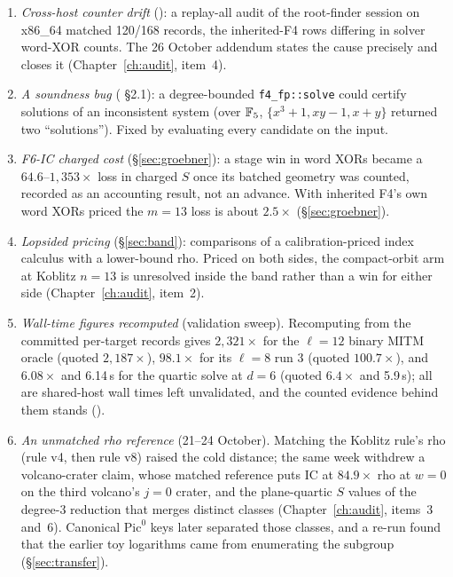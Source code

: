 \begin{enumerate}
\item \emph{Cross-host counter drift}
  (): a replay-all audit
  of the root-finder session on x86\_64 matched 120/168 records, the
  inherited-F4 rows differing in solver word-XOR counts. The 26 October
  addendum states the cause precisely and closes it (Chapter~\ref{ch:audit},
  item~4).
\item \emph{A soundness bug} (
  \S2.1): a degree-bounded \texttt{f4\_fp::solve} could certify solutions
  of an inconsistent system (over $\mathbb{F}_5$, $\{x^3+1,xy-1,x+y\}$ returned
  two ``solutions''). Fixed by evaluating every candidate on the input.
\item \emph{F6-IC charged cost} (\S\ref{sec:groebner}): a stage win in
  word XORs became a $64.6$--$1{,}353\times$ loss in charged $S$ once its
  batched geometry was counted, recorded as an accounting result, not an
  advance. With inherited F4's own word XORs priced the $m=13$ loss is about
  $2.5\times$ (\S\ref{sec:groebner}).
\item \emph{Lopsided pricing} (\S\ref{sec:band}): comparisons of a
  calibration-priced index calculus with a lower-bound rho. Priced on both
  sides, the compact-orbit arm at Koblitz $n=13$ is unresolved inside the
  band rather than a win for either side (Chapter~\ref{ch:audit}, item~2).
\item \emph{Wall-time figures recomputed} (validation sweep). Recomputing
  from the committed per-target records gives $2{,}321\times$ for the
  $\ell=12$ binary MITM oracle (quoted $2{,}187\times$), $98.1\times$ for its
  $\ell=8$ run 3 (quoted $100.7\times$), and $6.08\times$ and 6.14\,s for the
  quartic solve at $d=6$ (quoted $6.4\times$ and 5.9\,s); all are shared-host
  wall times left unvalidated, and the counted evidence behind them stands
  ().
\item \emph{An unmatched rho reference} (21--24 October). Matching the
  Koblitz rule's rho (rule v4, then rule v8) raised the cold distance; the
  same week withdrew a volcano-crater claim, whose matched reference puts
  IC at $84.9\times$ rho at $w=0$ on the third volcano's $j=0$ crater, and
  the plane-quartic $S$ values of the degree-3 reduction that merges
  distinct classes (Chapter~\ref{ch:audit}, items~3 and~6). Canonical
  $\mathrm{Pic}^0$ keys later separated those classes, and a re-run found
  that the earlier toy logarithms came from enumerating the subgroup
  (\S\ref{sec:transfer}).
\end{enumerate}
